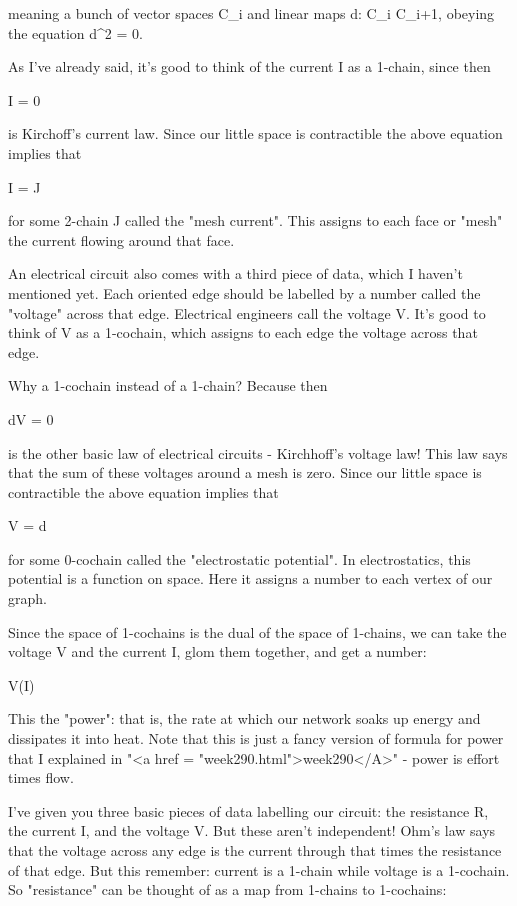meaning a bunch of vector spaces C_{i} and linear maps d: C_{i} \to  C_{i+1}, obeying the equation d^{2} = 0. 

As I've already said, it's good to think of the current I as a 1-chain,
since then

\delta I = 0 

is Kirchoff's current law.  Since our little space is contractible the
above equation implies that

I = \delta J

for some 2-chain J called the "mesh current".  This assigns to each
face or "mesh" the current flowing around that face.

An electrical circuit also comes with a third piece of data, which I
haven't mentioned yet.  Each oriented edge should be labelled by a
number called the "voltage" across that edge.  Electrical engineers
call the voltage V.  It's good to think of V as a 1-cochain, which
assigns to each edge the voltage across that edge.  

Why a 1-cochain instead of a 1-chain?  Because then

dV = 0

is the other basic law of electrical circuits - Kirchhoff's voltage
law!  This law says that the sum of these voltages around a mesh is
zero.  Since our little space is contractible the above equation
implies that

V = d\phi 

for some 0-cochain \phi  called the "electrostatic potential".  In 
electrostatics, this potential is a function on space.  Here it
assigns a number to each vertex of our graph.  

Since the space of 1-cochains is the dual of the space of 1-chains, we
can take the voltage V and the current I, glom them together, and get
a number:

V(I)

This the "power": that is, the rate at which our network
soaks up energy and dissipates it into heat.  Note that this is just a
fancy version of formula for power that I explained in "<a href =
"week290.html">week290</A>" - power is effort times flow.

I've given you three basic pieces of data labelling our circuit: the
resistance R, the current I, and the voltage V.  But these aren't
independent!  Ohm's law says that the voltage across any edge is the
current through that times the resistance of that edge.  But this
remember: current is a 1-chain while voltage is a 1-cochain.  So
"resistance" can be thought of as a map from 1-chains to
1-cochains:


